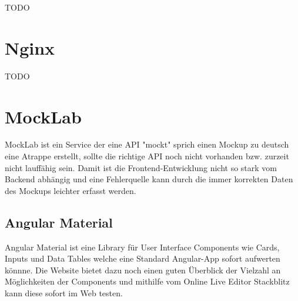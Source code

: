 TODO

\section{Nginx}

TODO

\section{MockLab}

MockLab ist ein Service der eine API "mockt" sprich einen Mockup zu deutsch eine Atrappe erstellt, sollte die richtige API noch nicht vorhanden bzw. zurzeit nicht lauffähig sein.
Damit ist die Frontend-Entwicklung nicht so stark vom Backend abhängig und eine Fehlerquelle kann durch die immer korrekten Daten des Mockups leichter erfasst werden.
\cite{sysarch-mocklab-1}

\subsection{Angular Material}
Angular Material ist eine Library für User Interface Components wie Cards, Inputs und Data Tables welche eine Standard Angular-App sofort aufwerten könnne.
Die Website bietet dazu noch einen guten Überblick der Vielzahl an Möglichkeiten der Components und mithilfe vom Online Live Editor Stackblitz kann diese sofort im Web testen. 
\cite{sysarch-angularMaterial-1} 
